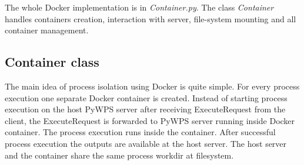 \documentclass[12pt,a4paper]{article}
\begin{document}
\begin{figure}[h!]
\centering
\begin{floatrow}
\end{floatrow}
\end{figure}

\bigskip
The whole Docker implementation is in \textit{Container.py}. The class \textit{Container} handles containers creation, interaction with
server, file-system mounting and all container management.

\newpage
\subsection{Container class}
The main idea of process isolation using Docker is quite simple. For every process execution one separate Docker container is created.
Instead of starting process execution on the host PyWPS server after receiving ExecuteRequest from the client, the ExecuteRequest is
forwarded to PyWPS server running inside Docker container. The process execution runs inside the container. After successful process
execution the outputs are available at the host server. The host server and the container share the same process workdir at filesystem.
\end{document}
